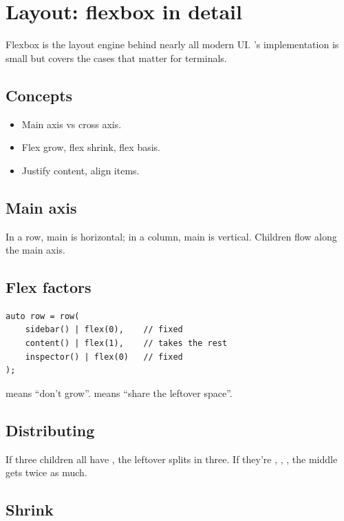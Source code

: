 \chapter{Layout: flexbox in detail}
\label{ch:flexbox2}

\begin{aside}
Flexbox is the layout engine behind nearly all modern UI.
\maya{}'s implementation is small but covers the cases that
matter for terminals.
\end{aside}

\section{Concepts}

\begin{itemize}[leftmargin=*]
  \item Main axis vs cross axis.
  \item Flex grow, flex shrink, flex basis.
  \item Justify content, align items.
\end{itemize}

\section{Main axis}

In a row, main is horizontal; in a column, main is
vertical. Children flow along the main axis.

\section{Flex factors}

\begin{lstlisting}
auto row = row(
    sidebar() | flex(0),    // fixed
    content() | flex(1),    // takes the rest
    inspector() | flex(0)   // fixed
);
\end{lstlisting}

 means ``don't grow''.  means
``share the leftover space''.

\section{Distributing}

If three children all have , the leftover
splits in three. If they're , ,
, the middle gets twice as much.

\section{Shrink}

